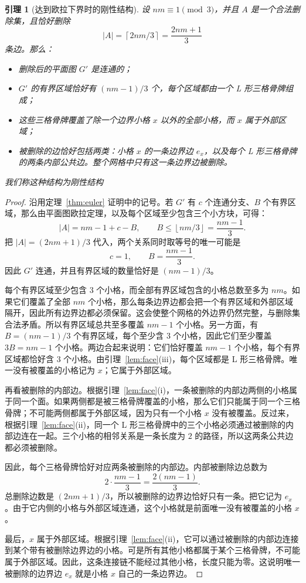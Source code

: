 \documentclass[11pt]{ctexart}
\newtheorem{lemma}[theorem]{引理}
\theoremstyle{definition}
\newcommand{\ceil}[1]{\left\lceil #1 \right\rceil}
\newcommand{\floor}[1]{\left\lfloor #1 \right\rfloor}
\begin{document}
\begin{lemma}[达到欧拉下界时的刚性结构]\label{lem:rigid}
设 $nm\equiv1\pmod3$，并且 $A$ 是一个合法删除集，且恰好删除
\[
|A|=\ceil{2nm/3}=\frac{2nm+1}{3}
\]
条边。那么：

\begin{itemize}
\item 删除后的平面图 $G'$ 是连通的；
\item $G'$ 的有界区域恰好有 $(nm-1)/3$ 个，每个区域都由一个 L 形三格骨牌组成；
\item 这些三格骨牌覆盖了除一个边界小格 $x$ 以外的全部小格，而 $x$ 属于外部区域；
\item 被删除的边恰好包括两类：小格 $x$ 的一条边界边 $e_x$，以及每个 L 形三格骨牌的两条内部公共边。整个网格中只有这一条边界边被删除。
\end{itemize}
我们称这种结构为刚性结构
\end{lemma}

\begin{proof}
沿用定理~\ref{thm:euler} 证明中的记号。若 $G'$ 有 $c$ 个连通分支、$B$ 个有界区域，那么由平面图欧拉定理，以及每个区域至少包含三个小方块，可得：
\[
|A|=nm-1+c-B,\qquad B\le\floor{nm/3}=\frac{nm-1}{3}.
\]
把 $|A|=(2nm+1)/3$ 代入，两个关系同时取等号的唯一可能是
\[
c=1,\qquad B=\frac{nm-1}{3}.
\]
因此 $G'$ 连通，并且有界区域的数量恰好是 $(nm-1)/3$。

每个有界区域至少包含 $3$ 个小格，而全部有界区域包含的小格总数至多为 $nm$。如果它们覆盖了全部 $nm$ 个小格，那么每条边界边都会把一个有界区域和外部区域隔开，因此所有边界边都必须保留。这会使整个网格的外边界仍然完整，与删除集合法矛盾。所以有界区域总共至多覆盖 $nm-1$ 个小格。另一方面，有 $B=(nm-1)/3$ 个有界区域，每个至少含 $3$ 个小格，因此它们至少覆盖 $3B=nm-1$ 个小格。两边合起来说明：它们恰好覆盖 $nm-1$ 个小格，每个有界区域都恰好含 $3$ 个小格。由引理~\ref{lem:face}(iii)，每个区域都是 L 形三格骨牌。唯一没有被覆盖的小格记为 $x$；它属于外部区域。

再看被删除的内部边。根据引理~\ref{lem:face}(i)，一条被删除的内部边两侧的小格属于同一个面。如果两侧都是被三格骨牌覆盖的小格，那么它们只能属于同一个三格骨牌；不可能两侧都属于外部区域，因为只有一个小格 $x$ 没有被覆盖。反过来，根据引理~\ref{lem:face}(ii)，同一个 L 形三格骨牌中的三个小格必须通过被删除的内部边连在一起。三个小格的相邻关系是一条长度为 $2$ 的路径，所以这两条公共边都必须被删除。

因此，每个三格骨牌恰好对应两条被删除的内部边。内部被删除边总数为
\[
2\cdot\frac{nm-1}{3}=\frac{2(nm-1)}3.
\]
总删除边数是 $(2nm+1)/3$，所以被删除的边界边恰好只有一条。把它记为 $e_x$。由于它内侧的小格与外部区域连通，这个小格就是前面唯一没有被覆盖的小格 $x$。

最后，$x$ 属于外部区域。根据引理~\ref{lem:face}(ii)，它可以通过被删除的内部边连接到某个带有被删除边界边的小格。可是所有其他小格都属于某个三格骨牌，不可能属于外部区域。因此，这条连接链不能经过其他小格，长度只能为零。这说明唯一被删除的边界边 $e_x$ 就是小格 $x$ 自己的一条边界边。
\end{proof}
\end{document}
